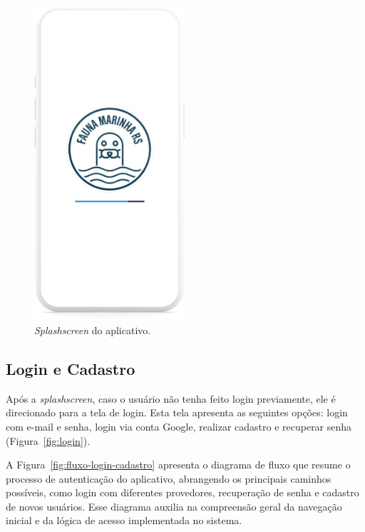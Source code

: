 \begin{figure}[H]
    \centering
    \includegraphics[width=0.5\textwidth]{imagens/sistema/device_frame/splashscreen.png}
    \caption{\textit{Splashscreen} do aplicativo.}
    \label{fig:splashscreen}
\end{figure}

\subsection{Login e Cadastro}
Após a \textit{splashscreen}, caso o usuário não tenha feito login previamente, ele 
é direcionado para a tela de login. Esta tela apresenta as seguintes opções: login com e-mail e senha, login via 
conta Google, realizar cadastro e recuperar senha (Figura~\ref{fig:login}).

A Figura~\ref{fig:fluxo-login-cadastro} apresenta o diagrama de fluxo que resume o processo de autenticação 
do aplicativo, abrangendo os principais caminhos possíveis, como login com diferentes provedores, 
recuperação de senha e cadastro de novos usuários. Esse diagrama auxilia na compreensão geral 
da navegação inicial e da lógica de acesso implementada no sistema.

